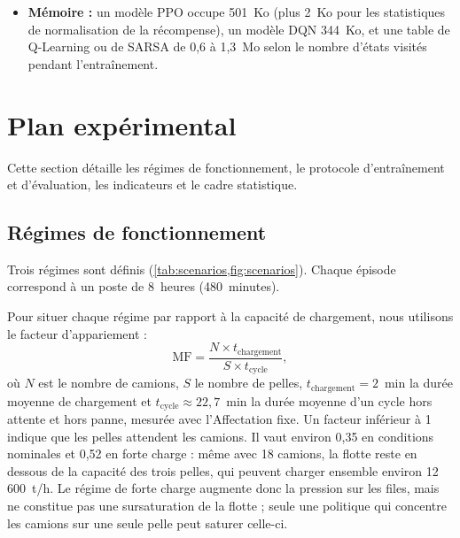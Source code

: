 \documentclass[11pt,a4paper]{article}
\newif\ifrevmarks
\newcommand{\revtag}[1]{\ifrevmarks\textsuperscript{\textcolor{red!70!black}{\scriptsize[#1]}}\fi}
\newcommand{\rev}[2]{\ifrevmarks{\color{revcolor}#2}\revtag{#1}\else#2\fi}
\newenvironment{revbloc}[1]{\par\ifrevmarks\color{revcolor}\noindent\revtag{#1}\ \fi}{\par}
\newcommand{\adir}[1]{\ifrevmarks\textcolor{violet}{\textbf{[À VALIDER AVEC LA DIRECTRICE : #1]}}\fi}
\begin{document}
\begin{revbloc}{M28, m20, m24, v3}
\begin{itemize}
  \item \textbf{Mémoire :} \rev{T31}{un modèle PPO occupe 501~Ko (plus 2~Ko pour les statistiques de normalisation de la récompense), un modèle DQN 344~Ko, et une table de Q-Learning ou de SARSA de 0,6 à 1,3~Mo selon le nombre d'états visités pendant l'entraînement.}
\end{itemize}
\end{revbloc}

\adir{revue cible à choisir après les résultats (premier choix proposé : Computers \& Operations Research) ; Cluster Computing est hors du champ de l'article (M28).}


\section{Plan expérimental}
\label{sec:design}

Cette section détaille les régimes de fonctionnement, le protocole d'entraînement et d'évaluation, les indicateurs et le cadre statistique.

\subsection{Régimes de fonctionnement}
\label{sec:scenarios}

Trois régimes sont définis (\cref{tab:scenarios,fig:scenarios}). Chaque épisode correspond à un poste de 8~heures (480~minutes).

\begin{revbloc}{M15}
Pour situer chaque régime par rapport à la capacité de chargement, nous utilisons le facteur d'appariement \cite{BurtCaccetta2014} :
\begin{equation}
\mathrm{MF} = \frac{N \times t_{\mathrm{chargement}}}{S \times t_{\mathrm{cycle}}} ,
\label{eq:mf}
\end{equation}
où $N$ est le nombre de camions, $S$ le nombre de pelles, $t_{\mathrm{chargement}} = 2$~min la durée moyenne de chargement et $t_{\mathrm{cycle}} \approx 22{,}7$~min la durée moyenne d'un cycle hors attente et hors panne, mesurée avec l'Affectation fixe. Un facteur inférieur à 1 indique que les pelles attendent les camions. Il vaut environ 0,35 en conditions nominales et 0,52 en forte charge : même avec 18 camions, la flotte reste en dessous de la capacité des trois pelles, qui peuvent charger ensemble environ 12\,600~t/h. Le régime de forte charge augmente donc la pression sur les files, mais ne constitue pas une sursaturation de la flotte ; seule une politique qui concentre les camions sur une seule pelle peut saturer celle-ci.
\end{revbloc}
\end{document}
